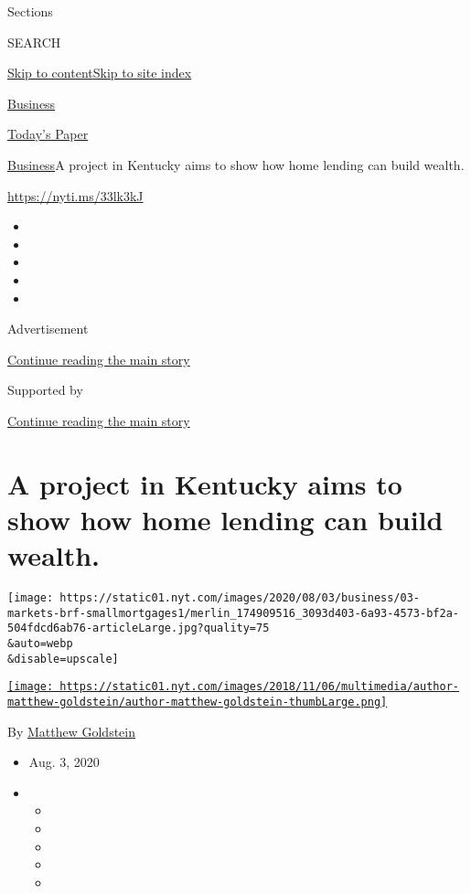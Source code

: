 Sections

SEARCH

\protect\hyperlink{site-content}{Skip to
content}\protect\hyperlink{site-index}{Skip to site index}

\href{https://www.nytimes.com/section/business}{Business}

\href{https://myaccount.nytimes.com/auth/login?response_type=cookie\&client_id=vi}{}

\href{https://www.nytimes.com/section/todayspaper}{Today's Paper}

\href{/section/business}{Business}\textbar{}A project in Kentucky aims
to show how home lending can build wealth.

\url{https://nyti.ms/33lk3kJ}

\begin{itemize}
\item
\item
\item
\item
\item
\end{itemize}

Advertisement

\protect\hyperlink{after-top}{Continue reading the main story}

Supported by

\protect\hyperlink{after-sponsor}{Continue reading the main story}

\hypertarget{a-project-in-kentucky-aims-to-show-how-home-lending-can-build-wealth}{%
\section{A project in Kentucky aims to show how home lending can build
wealth.}\label{a-project-in-kentucky-aims-to-show-how-home-lending-can-build-wealth}}

\texttt{[image: https://static01.nyt.com/images/2020/08/03/business/03-markets-brf-smallmortgages1/merlin\_174909516\_3093d403-6a93-4573-bf2a-504fdcd6ab76-articleLarge.jpg?quality=75\\\&auto=webp\\\&disable=upscale]}

\href{https://www.nytimes.com/by/matthew-goldstein}{\texttt{[image: https://static01.nyt.com/images/2018/11/06/multimedia/author-matthew-goldstein/author-matthew-goldstein-thumbLarge.png]}}

By \href{https://www.nytimes.com/by/matthew-goldstein}{Matthew
Goldstein}

\begin{itemize}
\item
  Aug. 3, 2020
\item
  \begin{itemize}
  \item
  \item
  \item
  \item
  \item
  \end{itemize}
\end{itemize}


